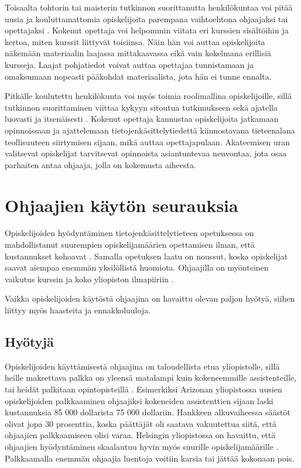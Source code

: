 \documentclass[finnish]{tktltiki2}
\theoremstyle{definition}
\theoremstyle{remark}
\begin{document}
Toisaalta tohtorin tai maisterin tutkinnon suorittanutta henkilökuntaa voi pitää uusia ja kouluttamattomia opiskelijoita parempana vaihtoehtona ohjaajaksi tai opettajaksi \cite{Baldwin00}. Kokenut opettaja voi helpommin viitata eri kurssien sisältöihin ja kertoa, miten kurssit liittyvät toisiinsa. Näin hän voi auttaa opiskelijoita näkemään materiaalin laajassa mittakaavassa eikä vain kokelmana erillisiä kursseja. Laajat pohjatiedot voivat auttaa opettajaa tunnistamaan ja omaksumaan nopeasti pääkohdat materiaalista, jota hän ei tunne ennalta. \par

Pitkälle koulutettu henkilökunta voi myös toimia roolimallina opiskelijoille, sillä tutkinnon suorittaminen viittaa kykyyn sitoutua tutkimukseen sekä ajatella luovasti ja itsenäisesti \cite{Baldwin00}. Kokenut opettaja kannustaa opiskelijoita jatkamaan opinnoissaan ja ajattelemaan tietojenkäsittelytiedettä kiinnostavana tieteenalana teollisuuteen siirtymisen sijaan, mikä auttaa opettajapulaan. Akateemisen uran valitsevat opiskelijat tarvitsevat opinnoista asiantuntevaa neuvontaa, jota osaa parhaiten antaa ohjaaja, jolla on kokemusta aiheesta. \par






\section{Ohjaajien käytön seurauksia}

Opiskelijoiden hyödyntäminen tietojenkäsittelytieteen opetuksessa on mahdollistanut suurempien opiskelijamäärien opettamisen ilman, että kustannukset kohoavat \cite{Reges88}. Samalla opetuksen laatu on noussut, koska opiskelijat saavat aiempaa enemmän yksilöllistä huomiota. Ohjaajilla on myönteinen vaikutus kurssin ja koko yliopiston ilmapiiriin \cite{Dickson11,Roberts95, Tashakkori05}. \par

Vaikka opiskelijoiden käytöstä ohjaajina on havaittu olevan paljon hyötyä, siihen liittyy myös haasteita ja ennakkoluuloja.  \par

\subsection{Hyötyjä}

Opiskelijoiden käyttämisestä ohjaajina on taloudellista etua yliopistolle, sillä heille maksettava palkka on yleensä matalampi kuin kokeneemmille assistenteille, tai heidät palkitaan opintopisteillä \cite{Reges88}. Esimerkiksi Arizonan yliopistossa uusien opiskelijoiden palkkaaminen ohjaajiksi kokeneiden assistenttien sijaan laski kustannuksia 85 000 dollarista 75 000 dollariin. Hankkeen alkuvaiheessa säästöt olivat jopa 30 prosenttia, koska päättäjät oli saatava vakuutettua siitä, että ohjaajien palkkaamiseen olisi varaa. Helsingin yliopistossa on havaittu, että ohjaajien hyödyntäminen skaalautuu hyvin myös suurille opiskelijamäärille \cite{Kurhila11}. Palkkaamalla enemmän ohjaajia luentoja voitiin karsia tai jättää kokonaan pois. \par
\end{document}
